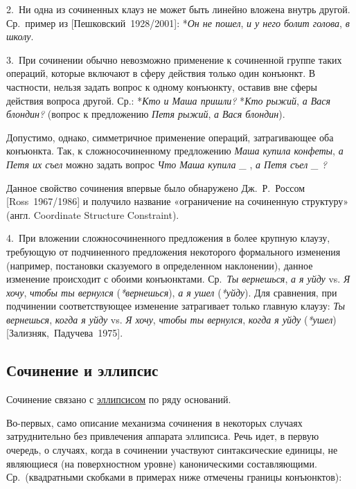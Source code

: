 2.~Ни одна из сочиненных клауз не может быть линейно вложена внутрь
другой. Ср.~пример из {[}Пешковский~1928/2001{]}: *\emph{Он не пошел},
\emph{и у него болит голова}, \emph{в школу}.

3.~При сочинении обычно невозможно применение к сочиненной группе таких
операций, которые включают в сферу действия только один конъюнкт. В
частности, нельзя задать вопрос к одному конъюнкту, оставив вне сферы
действия вопроса другой. Ср.: *\emph{Кто и Маша пришли?} *\emph{Кто
рыжий}, \emph{а Вася блондин?} (вопрос к предложению \emph{Петя рыжий},
\emph{а Вася блондин}).

Допустимо, однако, симметричное применение операций, затрагивающее оба
конъюнкта. Так, к сложносочиненному предложению \emph{Маша купила
конфеты}, \emph{а Петя их съел} можно задать вопрос \emph{Что Маша
купила \_} , \emph{а Петя съел \_ ?}

Данное свойство сочинения впервые было обнаружено Дж.~Р.~Россом
{[}Ross~1967/1986{]} и получило название «ограничение на сочиненную
структуру» (англ. Coordinate Structure Constraint).

4.~При вложении сложносочиненного предложения в более крупную клаузу,
требующую от подчиненного предложения некоторого формального изменения
(например, постановки сказуемого в определенном наклонении), данное
изменение происходит с обоими конъюнктами. Ср.~\emph{Ты вернешься},
\emph{а я уйду} vs. \emph{Я хочу}, \emph{чтобы ты вернулся}
(\emph{*вернешься}), \emph{а я ушел} (\emph{*уйду}). Для сравнения, при
подчинении соответствующее изменение затрагивает только главную клаузу:
\emph{Ты вернешься}, \emph{когда я уйду} vs. \emph{Я хочу}, \emph{чтобы
ты вернулся}, \emph{когда я уйду} (\emph{*ушел})
{[}Зализняк,~Падучева~1975{]}.

\hypertarget{ux441ux43eux447ux438ux43dux435ux43dux438ux435-ux438-ux44dux43bux43bux438ux43fux441ux438ux441}{%
\subsection{Сочинение и
эллипсис}\label{ux441ux43eux447ux438ux43dux435ux43dux438ux435-ux438-ux44dux43bux43bux438ux43fux441ux438ux441}}

Сочинение связано с \underline{эллипсисом} по ряду оснований.

Во-первых, само описание механизма сочинения в некоторых случаях
затруднительно без привлечения аппарата эллипсиса. Речь идет, в первую
очередь, о случаях, когда в сочинении участвуют синтаксические единицы,
не являющиеся (на поверхностном уровне) каноническими составляющими.
Ср.~(квадратными скобками в примерах ниже отмечены границы конъюнктов):

